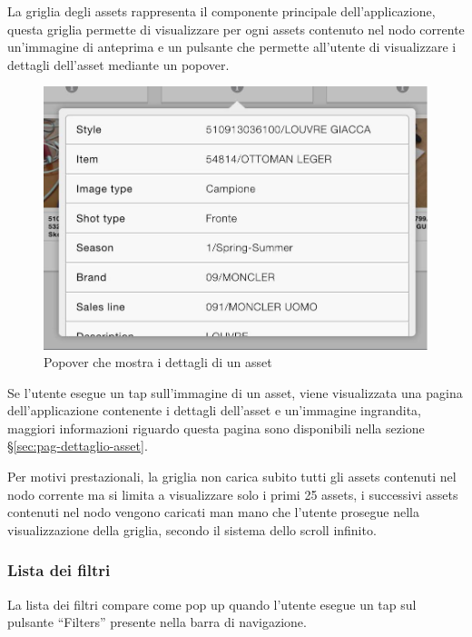 La griglia degli assets rappresenta il componente principale dell'applicazione, questa griglia permette di visualizzare per ogni assets contenuto nel nodo corrente un'immagine di anteprima e un pulsante che permette all'utente di visualizzare i dettagli dell'asset mediante un \gls{popover}.

\begin{figure}[htp]
\centering
\includegraphics[width=\textwidth*3/4]{../immagini/warda-gallery-dettaglio}
\caption{Popover che mostra i dettagli di un asset}  
\end{figure}

Se l'utente esegue un \gls{tap} sull'immagine di un asset, viene visualizzata una pagina dell'applicazione contenente i dettagli dell'asset e un'immagine ingrandita, maggiori informazioni riguardo questa pagina sono disponibili nella sezione §\ref{sec:pag-dettaglio-asset}.


Per motivi prestazionali, la griglia non carica subito tutti gli assets contenuti nel nodo corrente ma si limita a visualizzare solo i primi 25 assets, i successivi assets contenuti nel nodo vengono caricati man mano che l'utente prosegue nella visualizzazione della griglia, secondo il sistema dello scroll infinito.

\subsubsection{Lista dei filtri}

La lista dei filtri compare come pop up quando l'utente esegue un tap sul pulsante ``Filters'' presente nella barra di navigazione.

